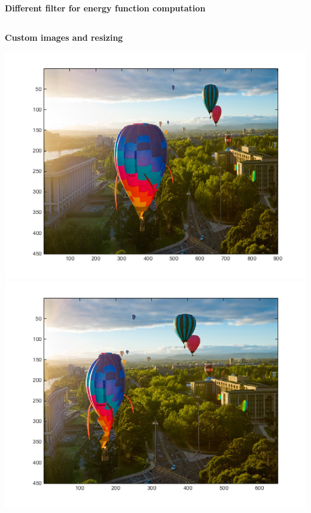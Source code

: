 \documentclass[11pt]{amsart}
\begin{document}
\subsection{}
\textbf{Different filter for energy function computation} \\
\begin{center}

\end{center}

\subsection{}
\textbf{Custom images and resizing} \\
\begin{center}
\includegraphics[scale=0.40]{originalBallons.png}
\includegraphics[scale=0.40]{outputReduceWidthBalloons.png}

\end{center}
\end{document}
